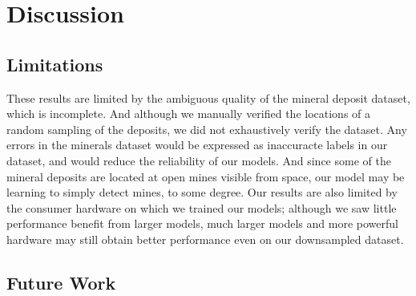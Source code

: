 \documentclass[10pt]{article}
\begin{document}

\section{Discussion}


\subsection{Limitations}

These results are limited by the ambiguous quality of the mineral deposit dataset,
which is incomplete. And although we manually verified the locations of a random
sampling of the deposits, we did not exhaustively verify the dataset. Any errors
in the minerals dataset would be expressed as inaccuracte labels in our dataset,
and would reduce the reliability of our models. And since some of the mineral deposits
are located at open mines visible from space, our model may be learning to simply
detect mines, to some degree. Our results are also limited by the consumer hardware
on which we trained our models; although we saw little performance benefit from
larger models, much larger models and more powerful hardware may still obtain
better performance even on our downsampled dataset.




\subsection{Future Work}

\end{document}
